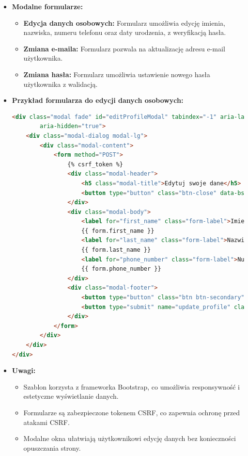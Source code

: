 \documentclass[12pt,a4paper,oneside]{article}
\theoremstyle{definition}
\numberwithin{equation}{section}
\begin{document}
\begin{itemize}
    \item \textbf{Modalne formularze:}
        \begin{itemize}
            \item \textbf{Edycja danych osobowych:}
            Formularz umożliwia edycję imienia, nazwiska, numeru telefonu oraz daty urodzenia, z weryfikacją hasła.
            \item \textbf{Zmiana e-maila:}
            Formularz pozwala na aktualizację adresu e-mail użytkownika.
            \item \textbf{Zmiana hasła:}
            Formularz umożliwia ustawienie nowego hasła użytkownika z walidacją.
        \end{itemize}
    \item \textbf{Przykład formularza do edycji danych osobowych:}
        \begin{lstlisting}[language=HTML, caption=Modal do edycji danych osobowych]
<div class="modal fade" id="editProfileModal" tabindex="-1" aria-labelledby="editProfileModalLabel"
        aria-hidden="true">
    <div class="modal-dialog modal-lg">
        <div class="modal-content">
            <form method="POST">
                {% csrf_token %}
                <div class="modal-header">
                    <h5 class="modal-title">Edytuj swoje dane</h5>
                    <button type="button" class="btn-close" data-bs-dismiss="modal"></button>
                </div>
                <div class="modal-body">
                    <label for="first_name" class="form-label">Imie</label>
                    {{ form.first_name }}
                    <label for="last_name" class="form-label">Nazwisko</label>
                    {{ form.last_name }}
                    <label for="phone_number" class="form-label">Numer telefonu</label>
                    {{ form.phone_number }}
                </div>
                <div class="modal-footer">
                    <button type="button" class="btn btn-secondary" data-bs-dismiss="modal">Anuluj</button>
                    <button type="submit" name="update_profile" class="btn btn-primary">Zapisz zmiany</button>
                </div>
            </form>
        </div>
    </div>
</div>
        \end{lstlisting}

    \item \textbf{Uwagi:}
        \begin{itemize}
            \item Szablon korzysta z frameworka Bootstrap, co umożliwia responsywność i estetyczne wyświetlanie danych.
            \item Formularze są zabezpieczone tokenem CSRF, co zapewnia ochronę przed atakami CSRF.
            \item Modalne okna ułatwiają użytkownikowi edycję danych bez konieczności opuszczania strony.
        \end{itemize}
\end{itemize}
\end{document}

